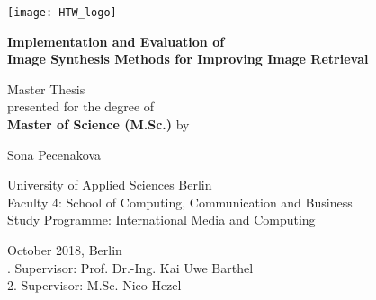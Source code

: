 \begin{titlepage}
    \begin{center}
        \texttt{[image: HTW\_logo]}    
    
        \vspace*{1cm}
        
        \Large
        \textbf{Implementation and Evaluation of \\ Image Synthesis Methods for Improving Image Retrieval}
        
        \Large
        \vspace{0.5cm}
        Master Thesis\\
        
        \vspace{1cm}
        \normalsize
        presented for the degree of\\
        \textbf{Master of Science (M.Sc.)} by
        
        \vspace{1cm}
		\large
        Sona Pecenakova
        
        \vspace{1.5cm}
        
\vfill
\noindent    
University of Applied Sciences Berlin\\
Faculty 4: School of Computing, Communication and Business\\
Study Programme: International Media and Computing

    \end{center}
        
\vspace{0.8cm}

\noindent
October 2018, Berlin \\
. Supervisor: Prof. Dr.-Ing. Kai Uwe Barthel\\
2. Supervisor: M.Sc. Nico Hezel\\
     
     
\end{titlepage}